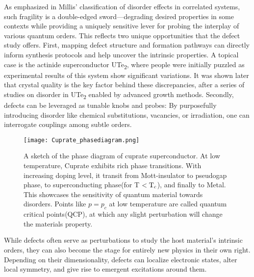 As emphasized in Millis’ classification of disorder effects in correlated systems\cite{millisClassificationEffectsDisorder2003}, such fragility is a double-edged sword—degrading desired properties in some contexts while providing a uniquely sensitive lever for probing the interplay of various quantum orders. This reflects two unique opportunities that the defect study offers. First, mapping defect structure and formation pathways can directly inform synthesis protocols and help uncover the intrinsic properties. A topical case is the actinide superconductor UTe\textsubscript{2}, where people were initially puzzled as experimental results of this system show significant variations. It was shown later that crystal quality is the key factor behind these discrepancies, after a series of studies on disorder in UTe\textsubscript{2} enabled by advanced growth methods\cite{aishwaryaMeltingChargeDensity2024}\cite{xueAdvancesSingleCrystal2025}. Secondly, defects can be leveraged as tunable knobs and probes: By purposefully introducing disorder like chemical substitutions, vacancies, or irradiation, one can interrogate couplings among subtle orders\cite{fradkinIntertwinedOrdersPhysics2025}\cite{ohDisentanglingIntertwinedOrders2025}.   

\begin{figure} 
	\centering
	\texttt{[image: Cuprate\_phasediagram.png]}
	\caption{A sketch of the phase diagram of cuprate superconductor\cite{tailleferScatteringPairingCuprate2010}. At low temperature, Cuprate exhibits rich phase transitions. With increasing doping level, it transit from Mott-insulator to pseudogap phase, to superconducting phase(for T $< \text{T}\textsubscript{c}$), and finally to Metal. This showcases the sensitivity of quantum material towards disorders. Points like $p=p_c$ at low temperature are called quantum critical points(QCP), at which any slight perturbation will change the materials property.}
	\label{fig:cuprate_pd}
\end{figure}

While defects often serve as perturbations to study the host material’s intrinsic orders, they can also become the stage for entirely new physics in their own right. Depending on their dimensionality, defects can localize electronic states, alter local symmetry, and give rise to emergent excitations around them.

